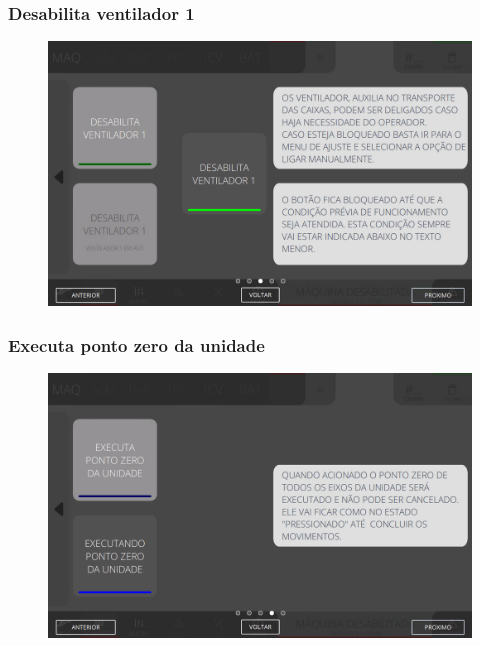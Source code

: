 \newpage
\thispagestyle{fancy}
\vspace*{40 pt}
\subsubsection{\small{Desabilita ventilador 1}} \label{sec:telaComandosEmpilhador2DesabilitaVentilador1}
\vspace*{\fill}
\begin{figure}[h]
    \centering
    \includegraphics[width=576 px,height=360 px]{src/imagesICV/08-stacker/commands/e-3.png}
\end{figure}
\vspace*{\fill}

\newpage
\thispagestyle{fancy}
\vspace*{40 pt}
\subsubsection{\small{Executa ponto zero da unidade}} \label{sec:telaComandosEmpilhador2ExecutaPontoZeroUnidade}
\vspace*{\fill}
\begin{figure}[h]
    \centering
    \includegraphics[width=576 px,height=360 px]{src/imagesICV/08-stacker/commands/e-4.png}
\end{figure}
\vspace*{\fill}

